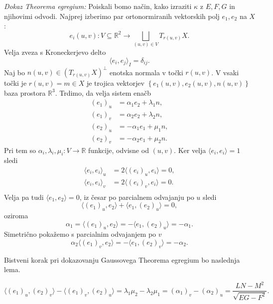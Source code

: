 \noindent
{\em Dokaz Theorema egregium:\/}
Poiskali bomo način, kako izraziti $\kappa$ z $E, F, G$ in njihovimi odvodi. Najprej izberimo par ortonormiranih
vektorskih polj $e_1, e_2$ na $X$: \begin{equation*}
e_i(u,v): V \subseteq \mathbb{R}^2  \to \bigsqcup_{(u,v) \in  V} T_{r(u,v)}X.
\end{equation*}  
Velja zveza s Kroneckerjevo delto \begin{equation*}
\langle e_i, e_j \rangle_{I} = \delta_{ij}. 
\end{equation*}
Naj bo $n(u,v) \in (T_{r(u,v)}X)^{\perp}$ enotska normala v točki $r(u,v)$. V vsaki točki je $r(u,v) = m \in  X$ je trojica vektorjev $\left\{ e_1(u,v), e_2(u,v), n(u,v)\right\}$ baza prostora $\mathbb{R}^3$. 
Trdimo, da velja sistem enačb \begin{align*}
    (e_1)_u &= \alpha_1 e_2 + \lambda_1 n, \\
    (e_1)_v &= \alpha_2 e_2 + \lambda_2 n, \\
    (e_2)_u &= - \alpha_1 e_1 + \mu_1 n, \\
    (e_2)_v &= - \alpha_2 e_1 + \mu_2 n.
\end{align*}
Pri tem so $\alpha_i, \lambda_i, \mu_i: V \to \mathbb{R}$ funkcije, odvisne od $(u,v)$.
Ker velja $\langle e_i, e_i \rangle = 1 $ sledi \begin{align*}
    \langle e_i, e_i \rangle_u  &=  2 \langle (e_i)_u, e_i \rangle  = 0, \\
    \langle e_i, e_i \rangle_v  &=  2 \langle (e_i)_v, e_i \rangle  = 0. \\
\end{align*}
Velja pa tudi $\langle e_1, e_2 \rangle = 0$, iz česar po parcialnem odvajanju po $u$ sledi
\begin{equation*}
    \langle (e_1)_u, e_2 \rangle + \langle e_1, (e_2)_u \rangle = 0, 
\end{equation*}  
oziroma \begin{equation*}
\alpha_1 = \langle (e_1)_u, e_2 \rangle = - \langle e_1, (e_2)_u \rangle = - \alpha_1.    
\end{equation*}  
Simetrično pokažemo s parcialnim odvajanjem po $v$ \begin{equation*}
\alpha_2 \langle (e_1)_v, e_2 \rangle = - \langle e_1, (e_2)_v \rangle = - \alpha_2.
\end{equation*}  

Bistveni korak pri dokazovanju Gaussovega Theorema egregium bo naslednja lema.
\begin{lema}
\begin{equation*}
\langle  (e_1)_u, (e_2)_v \rangle - \langle (e_1)_v , (e_2)_u \rangle  = \lambda_1 \mu_2 - \lambda_2 \mu_1 = (\alpha_1)_v - (\alpha_2)_u = \frac{LN - M^2}{\sqrt{EG - F^2} }.
\end{equation*}  
\end{lema}

